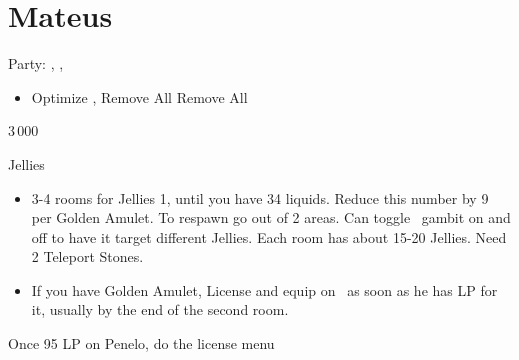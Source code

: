 \chapter{Mateus}
\begin{menu}
Party: \vaan, \ashe, \penelo
\end{menu}
\begin{equip}
	\begin{itemize}
		\vaanf Remove Mythril Blade, Escutcheon
		\item Optimize \ashe, \penelo
		\baschf Remove All
		\balthierf Remove All
	\end{itemize}
\end{equip}
\begin{shop}{3\,000}
\end{shop}
\begin{gambit}
	\begin{itemize}
	\end{itemize}
\end{gambit}
\begin{battle}{Jellies}
	\begin{itemize}
		\item 3-4 rooms for Jellies 1, until you have 34 liquids. Reduce this number by 9 per Golden Amulet. To respawn go out of 2 areas. Can toggle \ashe\ gambit on and off to have it target different Jellies. Each room has about 15-20 Jellies. Need 2 Teleport Stones.
		\item If you have Golden Amulet, License and equip on \vaan\ as soon as he has LP for it, usually by the end of the second room.
	\end{itemize}
\end{battle}
\begin{liscense}
	Once 95 LP on Penelo, do the license menu
	\begin{itemize}
	\end{itemize}
\end{liscense}
